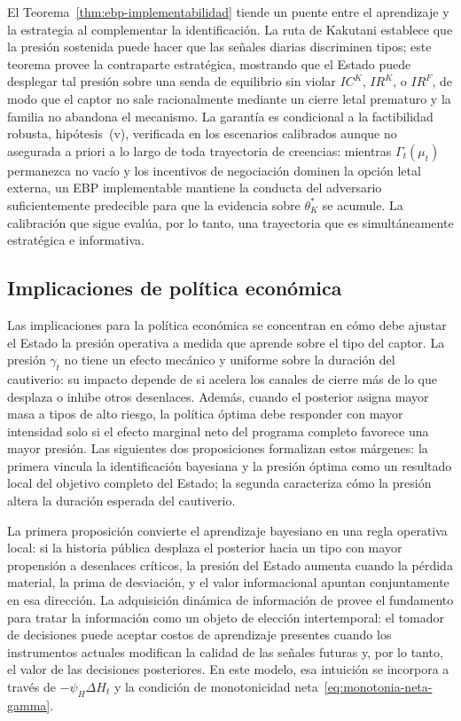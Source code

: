\documentclass[review,authoryear,12pt]{elsarticle}
\theoremstyle{plain}
\theoremstyle{definition}
\newcommand{\1}{\mathbf{1}}
\begin{document}
\noindent El Teorema~\ref{thm:ebp-implementabilidad} tiende un puente entre el aprendizaje y la estrategia al complementar la identificación. La ruta de Kakutani establece que la presión sostenida puede hacer que las señales diarias discriminen tipos; este teorema provee la contraparte estratégica, mostrando que el Estado puede desplegar tal presión sobre una senda de equilibrio sin violar $IC^K$, $IR^K$, o $IR^F$, de modo que el captor no sale racionalmente mediante un cierre letal prematuro y la familia no abandona el mecanismo. La garantía es condicional a la factibilidad robusta, hipótesis~(v), verificada en los escenarios calibrados aunque no asegurada a priori a lo largo de toda trayectoria de creencias: mientras $\Gamma_t(\mu_t)$ permanezca no vacío y los incentivos de negociación dominen la opción letal externa, un EBP implementable mantiene la conducta del adversario suficientemente predecible para que la evidencia sobre $\theta_K^\ast$ se acumule. La calibración que sigue evalúa, por lo tanto, una trayectoria que es simultáneamente estratégica e informativa.

\subsection{Implicaciones de política económica}\label{subsec:implicaciones-politica}

\noindent Las implicaciones para la política económica se concentran en cómo debe ajustar el Estado la presión operativa a medida que aprende sobre el tipo del captor. La presión $\gamma_t$ no tiene un efecto mecánico y uniforme sobre la duración del cautiverio: su impacto depende de si acelera los canales de cierre más de lo que desplaza o inhibe otros desenlaces. Además, cuando el posterior asigna mayor masa a tipos de alto riesgo, la política óptima debe responder con mayor intensidad solo si el efecto marginal neto del programa completo favorece una mayor presión. Las siguientes dos proposiciones formalizan estos márgenes: la primera vincula la identificación bayesiana y la presión óptima como un resultado local del objetivo completo del Estado; la segunda caracteriza cómo la presión altera la duración esperada del cautiverio.

\noindent La primera proposición convierte el aprendizaje bayesiano en una regla operativa local: si la historia pública desplaza el posterior hacia un tipo con mayor propensión a desenlaces críticos, la presión del Estado aumenta cuando la pérdida material, la prima de desviación, y el valor informacional apuntan conjuntamente en esa dirección. La adquisición dinámica de información de \citet{Zhong2022} provee el fundamento para tratar la información como un objeto de elección intertemporal: el tomador de decisiones puede aceptar costos de aprendizaje presentes cuando los instrumentos actuales modifican la calidad de las señales futuras y, por lo tanto, el valor de las decisiones posteriores. En este modelo, esa intuición se incorpora a través de $-\psi_H\Delta H_t$ y la condición de monotonicidad neta~\eqref{eq:monotonia-neta-gamma}.
\end{document}
